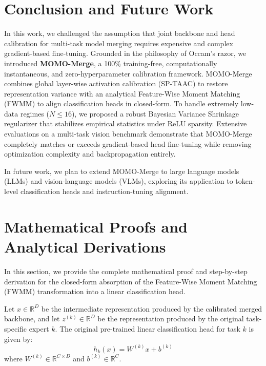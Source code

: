 \documentclass{article}
\theoremstyle{plain}
\theoremstyle{definition}
\theoremstyle{remark}
\begin{document}
\section{Conclusion and Future Work}
\label{sec:conclusion}

In this work, we challenged the assumption that joint backbone and head calibration for multi-task model merging requires expensive and complex gradient-based fine-tuning. Grounded in the philosophy of Occam's razor, we introduced \textbf{MOMO-Merge}, a 100\% training-free, computationally instantaneous, and zero-hyperparameter calibration framework. MOMO-Merge combines global layer-wise activation calibration (SP-TAAC) to restore representation variance with an analytical Feature-Wise Moment Matching (FWMM) to align classification heads in closed-form. To handle extremely low-data regimes ($N \le 16$), we proposed a robust Bayesian Variance Shrinkage regularizer that stabilizes empirical statistics under ReLU sparsity. Extensive evaluations on a multi-task vision benchmark demonstrate that MOMO-Merge completely matches or exceeds gradient-based head fine-tuning while removing optimization complexity and backpropagation entirely.

In future work, we plan to extend MOMO-Merge to large language models (LLMs) and vision-language models (VLMs), exploring its application to token-level classification heads and instruction-tuning alignment.




\newpage
\appendix
\onecolumn

\section{Mathematical Proofs and Analytical Derivations}
\label{app:proofs}

In this section, we provide the complete mathematical proof and step-by-step derivation for the closed-form absorption of the Feature-Wise Moment Matching (FWMM) transformation into a linear classification head.

Let $x \in \mathbb{R}^D$ be the intermediate representation produced by the calibrated merged backbone, and let $z^{(k)} \in \mathbb{R}^D$ be the representation produced by the original task-specific expert $k$.
The original pre-trained linear classification head for task $k$ is given by:
\begin{equation}
h_k(x) = W^{(k)} x + b^{(k)}
\end{equation}
where $W^{(k)} \in \mathbb{R}^{C \times D}$ and $b^{(k)} \in \mathbb{R}^C$.
\end{document}
